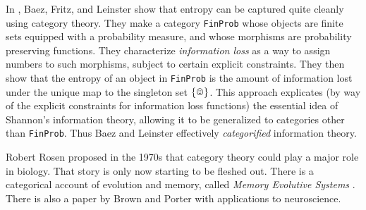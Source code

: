 In \cite{BFL}, Baez, Fritz, and Leinster show that entropy can be captured quite cleanly using category theory. They make a category {\tt FinProb} whose objects are finite sets equipped with a probability measure, and whose morphisms are probability preserving functions. They characterize {\em information loss} as a way to assign numbers to such morphisms, subject to certain explicit constraints. They then show that the entropy of an object in {\tt FinProb} is the amount of information lost under the unique map to the singleton set $\singleton$. This approach explicates (by way of the explicit constraints for information loss functions) the essential idea of Shannon's information theory, allowing it to be generalized to categories other than {\tt FinProb}. Thus Baez and Leinster effectively {\em categorified} information theory.

Robert Rosen proposed in the 1970s that category theory could play a major role in biology. That story is only now starting to be fleshed out. There is a categorical account of evolution and memory, called {\em Memory Evolutive Systems} \cite{EV}. There is also a paper \cite{BP2} by Brown and Porter with applications to neuroscience.

